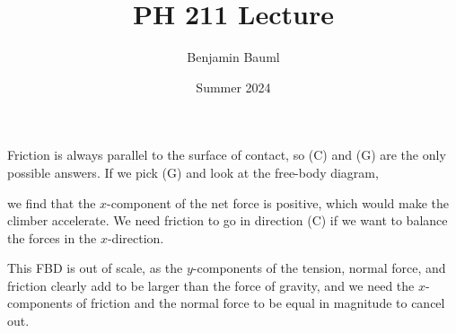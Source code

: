 \documentclass[]{article}
\title{PH 211 Lecture \Week}
\author{Benjamin Bauml}
\date{Summer 2024}
\begin{document}
\begin{TeacherMargin}
\noindent Friction is always parallel to the surface of contact, so (C) and (G) are the only possible answers. If we pick (G) and look at the free-body diagram,
\begin{center}
\end{center}
we find that the $x$-component of the net force is positive, which would make the climber accelerate. We need friction to go in direction (C) if we want to balance the forces in the $x$-direction.
\begin{center}
\end{center}
This FBD is out of scale, as the $y$-components of the tension, normal force, and friction clearly add to be larger than the force of gravity, and we need the $x$-components of friction and the normal force to be equal in magnitude to cancel out.
\end{TeacherMargin}
\end{document}
